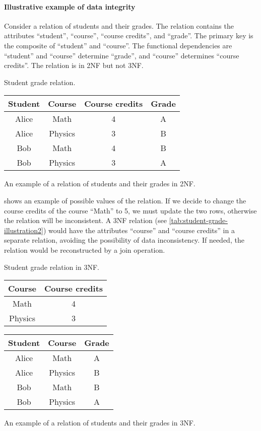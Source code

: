\paragraph{Illustrative example of data integrity}  Consider a relation of students and
their grades.  The relation contains the attributes ``student'', ``course'', ``course
credits'', and ``grade''.  The primary key is the composite of ``student'' and ``course''.
The functional dependencies are ``student'' and ``course'' determine ``grade'', and
``course'' determines ``course credits''.  The relation is in 2NF but not 3NF.

\begin{tablebox}[label=tab:student-grade-illustration]{Student grade relation.}
  \centering
  \begin{tabular}{cccc}
    \toprule
    \textbf{Student} & \textbf{Course} & \textbf{Course credits} & \textbf{Grade} \\
    \midrule
    Alice & Math & 4 & A \\
    Alice & Physics & 3 & B \\
    Bob & Math & 4 & B \\
    Bob & Physics & 3 & A \\
    \bottomrule
  \end{tabular}
  \tcblower
  An example of a relation of students and their grades in 2NF.
\end{tablebox}

 shows an example of possible values of the relation.
If we decide to change the course credits of the course ``Math'' to 5, we must update the
two rows, otherwise the relation will be inconsistent.  A 3NF relation (see
\cref{tab:student-grade-illustration2}) would have the attributes ``course'' and ``course
credits'' in a separate relation, avoiding the possibility of data inconsistency.  If
needed, the relation would be reconstructed by a join operation.

\begin{tablebox}[label=tab:student-grade-illustration2]{Student grade relation in 3NF.}
  \centering
  \begin{tabular}{cc}
    \toprule
    \textbf{Course} & \textbf{Course credits} \\
    \midrule
    Math & 4 \\
    Physics & 3 \\
    \bottomrule
  \end{tabular}
  \quad
  \begin{tabular}{ccc}
    \toprule
    \textbf{Student} & \textbf{Course} & \textbf{Grade} \\
    \midrule
    Alice & Math & A \\
    Alice & Physics & B \\
    Bob & Math & B \\
    Bob & Physics & A \\
    \bottomrule
  \end{tabular}
  \tcblower
  An example of a relation of students and their grades in 3NF.
\end{tablebox}

